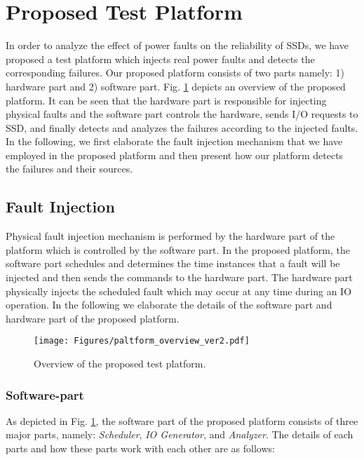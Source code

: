 \vspace{-1em}
\section{Proposed Test Platform}
\vspace{-0.6em}
\label{sec:proposed}
In order to analyze the effect of power faults on the reliability of SSDs, we have proposed a test platform which injects real power faults and detects the corresponding failures.
Our proposed platform consists of two parts namely: 1) hardware part and 2) software part. Fig. \ref{fig:overview} depicts an overview of the proposed platform. It can be seen that the hardware part is responsible for injecting physical faults and the software part controls the hardware, sends I/O requests to SSD, and finally detects and analyzes the failures according to the injected faults. In the following, we first elaborate the fault injection mechanism that we have employed in the proposed platform and then present how our platform detects the failures and their sources.
\vspace{-1em}
\subsection{Fault Injection}
\vspace{-0.7em}
\label{sec:fault_injection}
Physical fault injection mechanism is performed by the hardware part of the platform which is controlled by the software part. In the proposed platform, the software part schedules and determines the time instances that a fault will be injected and then sends the commands to the hardware part. The hardware part physically injects the scheduled fault which may occur at any time during an IO operation. In the following we elaborate the details of the software part and hardware part of the proposed platform. 

\begin{figure}
	\centering
	\texttt{[image: Figures/paltform\_overview\_ver2.pdf]}
	\vspace{-0.5em}
	\caption{Overview of the proposed test platform.}
	\vspace{-2em}
	\label{fig:overview}
\end{figure}
\subsubsection{Software-part}
\vspace{-0.7em}
\label{sec:sw}
As depicted in Fig. \ref{fig:overview}, the software part of the proposed platform consists of three major parts, namely: \emph{Scheduler}, \emph{IO Generator}, and \emph{Analyzer}. The details of each parts and how these parts work with each other are as follows:
